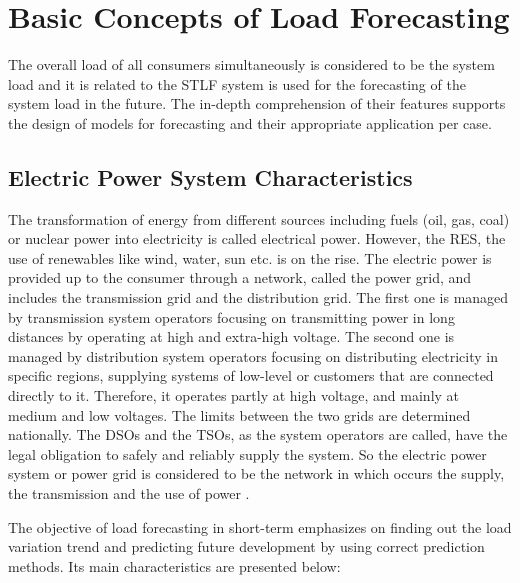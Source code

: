 \chapter{Basic Concepts of Load Forecasting}
The overall load of all consumers simultaneously is considered to be the system load and it is related to the STLF system is used for the forecasting of the system load in the future. The in-depth comprehension of their features supports the design of models for forecasting and their appropriate application per case.
\section{Electric Power System Characteristics}
The transformation of energy from different sources including fuels (oil, gas, coal) or nuclear power into electricity is called electrical power. However, the RES, the use of renewables like wind, water, sun etc. is on the rise. The electric power is provided up to the consumer through a network, called the power grid, and includes the transmission grid and the distribution grid. The first one is managed by transmission system operators focusing on transmitting power in long distances by operating at high and extra-high voltage. The second one is managed by distribution system operators focusing on distributing electricity in specific regions, supplying systems of low-level or customers that are connected directly to it. Therefore, it operates partly at high voltage, and mainly at medium and low voltages. The limits between the two grids are determined nationally. The DSOs and the TSOs, as the system operators are called, have the legal obligation to safely and reliably supply the system. So the electric power system or power grid is considered to be the network in which occurs the supply, the transmission and the use of power \cite{jyothi1999electrical}.
\par The objective of load forecasting in short-term emphasizes on finding out the load variation trend and predicting future development by using correct prediction methods. Its main characteristics are presented below:
